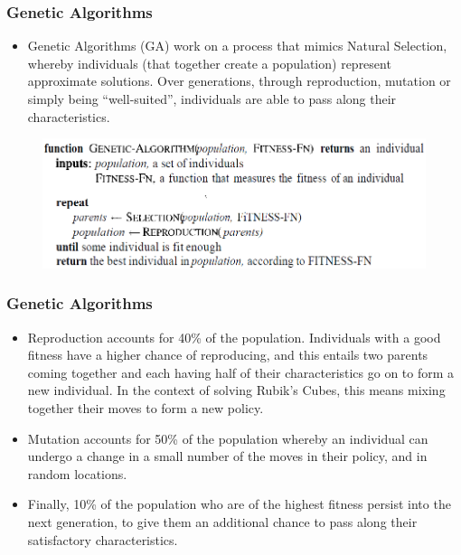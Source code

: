 \documentclass{beamer}
\begin{document}
\begin{frame}
\frametitle{Genetic Algorithms}
\begin{itemize}
    \item Genetic Algorithms (GA) work on a process that mimics Natural Selection, whereby individuals (that together create a population) represent approximate solutions. Over generations, through reproduction, mutation or simply being ``well-suited'', individuals are able to pass along their characteristics.
\end{itemize}

\begin{figure}[!h]
\begin{small}
\centering
\linespread{1.0}
\includegraphics[width=0.75\linewidth]{images/genetic algorithm}
\label{fig:fig11}
\end{small}
\end{figure}

\end{frame}

\begin{frame}
\frametitle{Genetic Algorithms}
\begin{itemize}
    \item Reproduction accounts for 40\% of the population. Individuals with a good fitness have a higher chance of reproducing, and this entails two parents coming together and each having half of their characteristics go on to form a new individual. In the context of solving Rubik's Cubes, this means mixing together their moves to form a new policy.
    \item Mutation accounts for 50\% of the population whereby an individual can undergo a change in a small number of the moves in their policy, and in random locations.
    \item Finally, 10\% of the population who are of the highest fitness persist into the next generation, to give them an additional chance to pass along their satisfactory characteristics.
\end{itemize}

\end{frame}
\end{document}
